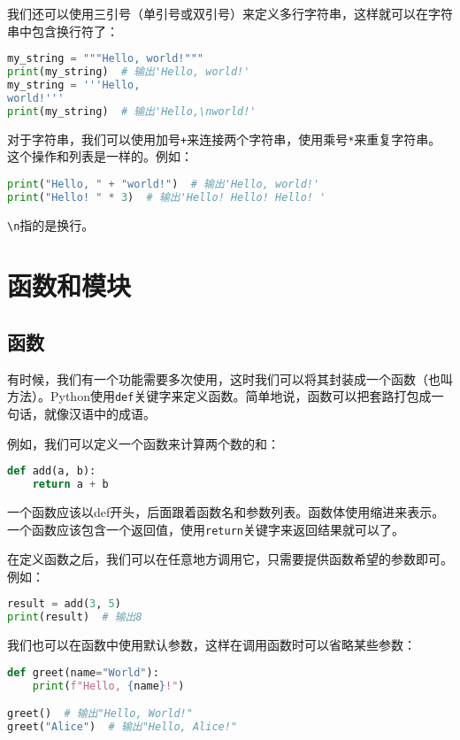 \documentclass[../main.tex]{subfiles}
\begin{document}
我们还可以使用三引号（单引号或双引号）来定义多行字符串，这样就可以在字符串中包含换行符了：
\begin{lstlisting}[language=python]
my_string = """Hello, world!"""
print(my_string)  # 输出'Hello, world!'
my_string = '''Hello,
world!'''
print(my_string)  # 输出'Hello,\nworld!'
\end{lstlisting}

对于字符串，我们可以使用加号\texttt{+}来连接两个字符串，使用乘号\texttt{*}来重复字符串。这个操作和列表是一样的。例如：
\begin{lstlisting}[language=python]
print("Hello, " + "world!")  # 输出'Hello, world!'
print("Hello! " * 3)  # 输出'Hello! Hello! Hello! '
\end{lstlisting}

\texttt{\textbackslash n}指的是换行。

\section{函数和模块}\label{sec:functions-and-modules}

\subsection{函数}

有时候，我们有一个功能需要多次使用，这时我们可以将其封装成一个函数（也叫方法）。Python使用\texttt{def}关键字来定义函数。简单地说，函数可以把套路打包成一句话，就像汉语中的成语。

例如，我们可以定义一个函数来计算两个数的和：
\begin{lstlisting}[language=python]
def add(a, b):
    return a + b
\end{lstlisting}

一个函数应该以def开头，后面跟着函数名和参数列表。函数体使用缩进来表示。一个函数应该包含一个返回值，使用\texttt{return}关键字来返回结果就可以了。

在定义函数之后，我们可以在任意地方调用它，只需要提供函数希望的参数即可。例如：
\begin{lstlisting}[language=python]
result = add(3, 5)
print(result)  # 输出8
\end{lstlisting}

我们也可以在函数中使用默认参数，这样在调用函数时可以省略某些参数：
\begin{lstlisting}[language=python]
def greet(name="World"):
    print(f"Hello, {name}!")

greet()  # 输出"Hello, World!"
greet("Alice")  # 输出"Hello, Alice!"
\end{lstlisting}
\end{document}

